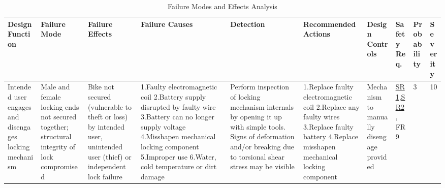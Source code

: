 \documentclass{article}
\begin{document}
\begin{table}[H]

\caption{Failure Modes and Effects Analysis}
\tiny

\begin{tabular}{| p{} | p{}  | p{} | p{} | p{} | p{} | p{} | p{} | p{} |p{} | }
\hline
\textbf{Design Function} & \textbf{Failure Mode} & \textbf{Failure Effects} & \textbf{Failure Causes} & \textbf{Detection} & \textbf{Recommended Actions} & \textbf{Design Controls} & \textbf{Safety Req.}  & \textbf{Probability} & \textbf{Severity}\\ \hline

Intended user engages and disengages locking mechanism & Male and female locking ends not secured together; structural integrity of lock compromised & Bike not secured (vulnerable to theft or loss) by intended user, unintended user (thief) or independent lock failure & 1.Faulty electromagnetic coil \newline 2.Battery supply disrupted by faulty wire \newline 3.Battery can no longer supply voltage \newline 4.Misshapen mechanical locking component \newline 5.Improper use \newline 6.Water, cold temperature or dirt damage & Perform inspection of locking mechanism internals by opening it up with simple tools. Signs of deformation and/or breaking due to torsional shear stress may be visible & 1.Replace faulty electromagnetic coil \newline 2.Replace any faulty wires \newline 3.Replace faulty battery \newline 4.Replace misshapen mechanical locking component & Mechanism to manually disengage provided & \hyperref[SR1]{SR1},\hyperref[SR2]{SR2}, FR9 & 3 & 10  \\ \hline


\end{tabular}
\end{table}
\end{document}
